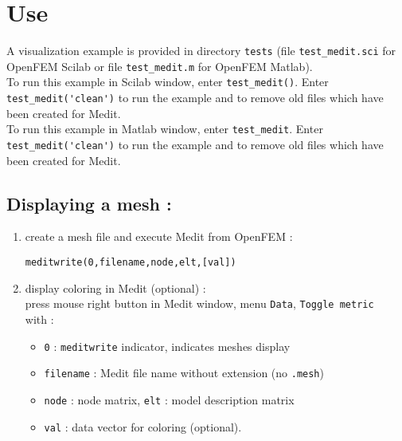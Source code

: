 \documentclass[a4paper]{article}
\begin{document}
\section{Use}
A visualization example is provided in directory \verb+tests+ (file \verb+test_medit.sci+ for OpenFEM Scilab or file \verb+test_medit.m+ for OpenFEM Matlab).\\
To run this example in Scilab window, enter \verb+test_medit()+. Enter \verb+test_medit('clean')+ to run the example and to remove old files which have been created for Medit.\\
To run this example in Matlab window, enter \verb+test_medit+. Enter \verb+test_medit('clean')+ to run the example and to remove old files which have been created for Medit.
\subsection{Displaying a mesh :}
\begin{enumerate}
\item create a mesh file and execute Medit from OpenFEM :
\begin{center}  \verb+meditwrite(0,filename,node,elt,[val])+ \end{center}
\item display coloring in Medit (optional) :\\
press mouse right button in Medit window, menu \verb+Data+, \verb+Toggle metric+\\
$ $\\
with : 
\begin{itemize}
\item \verb+0+ : \verb+meditwrite+ indicator, indicates meshes display
\item \verb+filename+ : Medit file name without extension (no \verb+.mesh+)
\item \verb+node+ : node matrix, \verb+elt+ : model description matrix
\item \verb+val+ : data vector for coloring (optional).
\end{itemize}
\end{enumerate}
\end{document}
